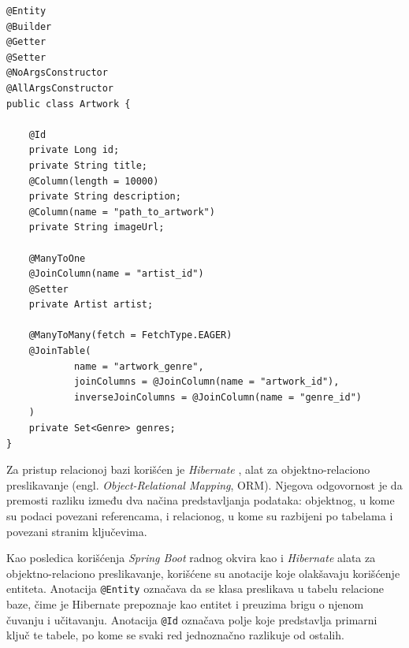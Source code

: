 \documentclass[12pt,oneside]{memoir}
\begin{document}
\begin{lstlisting}
@Entity
@Builder
@Getter
@Setter
@NoArgsConstructor
@AllArgsConstructor
public class Artwork {

    @Id
    private Long id;
    private String title;
    @Column(length = 10000)
    private String description;
    @Column(name = "path_to_artwork")
    private String imageUrl;

    @ManyToOne
    @JoinColumn(name = "artist_id")
    @Setter
    private Artist artist;

    @ManyToMany(fetch = FetchType.EAGER)
    @JoinTable(
            name = "artwork_genre",
            joinColumns = @JoinColumn(name = "artwork_id"),
            inverseJoinColumns = @JoinColumn(name = "genre_id")
    )
    private Set<Genre> genres;
}
\end{lstlisting}

Za pristup relacionoj bazi korišćen je \textit{Hibernate}
\cite{hibernate, bauer2015}, alat za objektno-relaciono preslikavanje
(engl. \textit{Object-Relational Mapping}, ORM). Njegova odgovornost je da premosti
razliku između dva načina predstavljanja podataka: objektnog, u kome su podaci
povezani referencama, i relacionog, u kome su razbijeni po tabelama i povezani
stranim ključevima. 

Kao posledica korišćenja \textit{Spring Boot} radnog okvira kao i \textit{Hibernate} alata za objektno-relaciono preslikavanje,
 korišćene su anotacije koje olakšavaju korišćenje entiteta. 
Anotacija \texttt{@Entity} označava da se klasa preslikava u tabelu relacione
baze, čime je Hibernate prepoznaje kao entitet i preuzima brigu o njenom
čuvanju i učitavanju. Anotacija \texttt{@Id} označava polje koje predstavlja
primarni ključ te tabele, po kome se svaki red jednoznačno razlikuje od
ostalih. 
\end{document}
